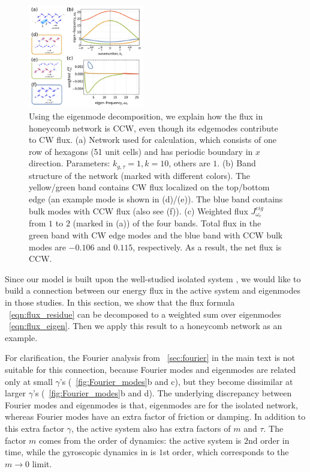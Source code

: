 \documentclass[
 amsmath,amssymb,
 aps,
 pre,
 longbibliography,
 10pt, onecolumn,
 notitlepage
]{revtex4-1}
\begin{document}
\begin{figure}[ht]
	\centering
	\includegraphics[width=0.45\textwidth]{eigen_modes.pdf}
    \caption{Using the eigenmode decomposition, we explain how the flux in honeycomb network is CCW, even though its edgemodes contribute to CW flux.
    (a) Network used for calculation, which consists of one row of hexagons (51 unit cells) and has periodic boundary in $x$ direction. Parameters: $k_{g,\tau}=1, k=10$, others are $1$.
    (b) Band structure of the network (marked with different colors). The yellow/green band contains CW flux localized on the top/bottom edge (an example mode is shown in (d)/(e)). The blue band contains bulk modes with CCW flux (also see (f)).
    (c) Weighted flux $J_{\omega_e}^{eig}$ from $1$ to $2$ (marked in (a)) of the four bands. Total flux in the green band with CW edge modes and the blue band with CCW bulk modes are $-0.106$ and $0.115$, respectively. As a result, the net flux is CCW.
    }
    \label{fig:eigen_modes}
\end{figure}

Since our model is built upon the well-studied isolated system \cite{Nash2015TopologicalMechanics,Susstrunk2016ClassificationTopological,Mitchell2018AmorphousTopological,Lee2018TopologicalDynamics}, we would like to build a connection between our energy flux in the active system and eigenmodes in those studies.
In this section, we show that the flux formula \eqnname~\eqref{eqn:flux_residue} can be decomposed to a weighted sum over eigenmodes \eqnname~\eqref{eqn:flux_eigen}. Then we apply this result to a honeycomb network as an example.

For clarification, the Fourier analysis from \secname~\ref{sec:fourier} in the main text is not suitable for this connection, because Fourier modes and eigenmodes are related only at small $\gamma$'s (\figurename~\ref{fig:Fourier_modes}b and c), but they become dissimilar at larger $\gamma$'s (\figurename~\ref{fig:Fourier_modes}b and d).
The underlying discrepancy between Fourier modes and eigenmodes is that, eigenmodes are for the isolated network, whereas Fourier modes have an extra factor of friction or damping.
In addition to this extra factor $\gamma$,
the active system also has extra factors of $m$ and $\tau$. The factor $m$ comes from the order of dynamics: the active system is $2$nd order in time, while the gyroscopic dynamics in \cite{Nash2015TopologicalMechanics} is $1$st order, which corresponds to the $m\rightarrow 0$ limit.
\end{document}
